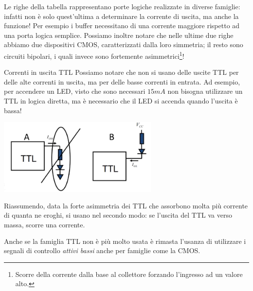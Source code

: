 \documentclass[
]{book}
\begin{document}
Le righe della tabella rappresentano porte logiche realizzate in diverse
famiglie: infatti non è solo quest'ultima a determinare la corrente di
uscita, ma anche la funzione! Per esempio i buffer necessitano di una
corrente maggiore rispetto ad una porta logica semplice. Possiamo
inoltre notare che nelle ultime due righe abbiamo due dispositivi CMOS,
caratterizzati dalla loro simmetria; il resto sono circuiti bipolari, i
quali invece sono fortemente asimmetrici\footnote{Scorre della corrente
  dalla base al collettore forzando l'ingresso ad un valore alto.}!

\begin{bluebox}{Correnti in uscita TTL}
Possiamo notare che non si usano delle uscite TTL per delle alte correnti in uscita, ma per delle basse correnti in entrata.\newline
Ad esempio, per accendere un LED, visto che sono necessari $15mA$ non bisogna utilizzare un TTL in logica diretta, ma è necessario che il LED si accenda quando l'uscita è bassa!
\begin{center}
\begin{minipage}[c]{0.6\linewidth}
\centering
\includegraphics[width=0.6\textwidth]{assets/imgs/ttl_input_output.png}
\end{minipage}
\end{center}
Riassumendo, data la forte asimmetria dei TTL che assorbono molta più corrente di quanta ne eroghi, si usano nel secondo modo: se l'uscita del TTL va verso massa, scorre una corrente.

Anche se la famiglia TTL non è più molto usata è rimasta l'usanza di utilizzare i segnali di controllo \emph{attivi bassi} anche per famiglie come la CMOS.
\end{bluebox}
\end{document}
